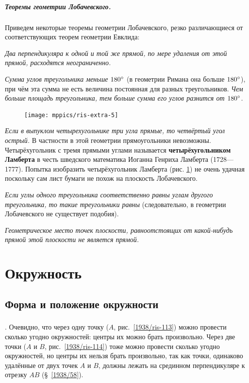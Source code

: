 \documentclass[twoside]{book}
\makeatletter
\newcommand{\rindex}[2][\imki@jobname]{%
  \index[#1]{\detokenize{#2}}%
}
\makeatother
\begin{document}
\paragraph{Теоремы геометрии Лобачевского.}\label{1914/95} Приведем некоторые теоремы геометрии Лобачевского, резко различающиеся от соответствующих теорем геометрии Евклида:

\emph{Два перпендикуляра к одной и той же прямой, по мере удаления
от этой прямой, расходятся неограниченно.}

\emph{Сумма углов треугольника меньше $180\degree$} (в геометрии Римана она
больше $180\degree$), при чём эта сумма не есть величина постоянная для разных треугольников.
\emph{Чем больше площадь треугольника, тем больше сумма его углов разнится от $180\degree$.}



\begin{figure}
\centering
\texttt{[image: mppics/ris-extra-5]}
\caption{}\label{extra/ris-5}
\end{figure}

\emph{Если в выпуклом четырехугольнике три угла прямые, то четвёртый угол острый.} В частности в этой геометрии прямоугольники невозможны.
Четырёхугольник с тремя прямыми углами называется \rindex{четырёхугольник Ламберта}\textbf{четырёхугольником Ламберта} в честь шведского математика Иоганна Генриха Ламберта (1728---1777).
Попытка изобразить четырёхугольник Ламберта (рис. \ref{extra/ris-5}) не очень удачная поскольку сам лист бумаги не похож на плоскость Лобачевского. %


\emph{Если углы одного треугольника соответственно равны углам другого треугольника, то такие треугольники равны} (следовательно, в геометрии Лобачевского не существует подобия).

\emph{Геометрическое место точек плоскости, равноотстоящих от какой-нибудь прямой этой плоскости не является прямой.}


\chapter{Окружность}

\section{Форма и положение окружности}

\paragraph{}\label{1938/103}
.
Очевидно, что через одну точку ($A$, рис.~\ref{1938/ris-113}) можно провести сколько угодно окружностей:
центры их можно брать произвольно.
Через две точки ($A$ и $B$, рис.~\ref{1938/ris-114}) тоже можно провести сколько угодно окружностей, но центры их нельзя брать произвольно, так как точки, одинаково удалённые от двух точек $A$ и $B$, должны лежать на срединном перпендикуляре к отрезку $AB$ (§~\ref{1938/58}). 
\end{document}
